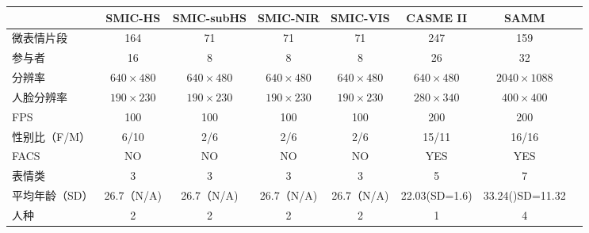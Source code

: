 \begin{table}[!htbp]
    \label{tab1}
    \centering
    \footnotesize%
    \setlength{\tabcolsep}{4pt}%
    \renewcommand{\arraystretch}{1.2}%
    \begin{tabular}{lccccccc}
    \hline
         & SMIC-HS &  SMIC-subHS &  SMIC-NIR &  SMIC-VIS &  CASME II &  SAMM \\ \hline
微表情片段    & 164       & 71         & 71       & 71       & 247           & 159             \\
参与者      & 16        & 8          & 8        & 8        & 26            & 32              \\
分辨率      & $640\times480$   & $640\times480$    & $640\times480$  & $640\times480$  & $640\times480$       & $2040\times1088$      \\
人脸分辨率    & $190\times230$   & $190\times230$    & $190\times230$  & $190\times230$  & $280\times340$       & $400\times400$         \\
FPS      & 100       & 100        & 100      & 100      & 200           & 200             \\ 
性别比（F/M） & 6/10      &  2/6          &  2/6        &  2/6        & 15/11         & 16/16           \\ 
FACS     & NO        & NO         & NO       & NO       & YES           & YES             \\
表情类      & 3         & 3          & 3        & 3        & 5             & 7               \\
平均年龄（SD） & 26.7（N/A) &   26.7（N/A) &  26.7（N/A) & 26.7（N/A)  & 22.03(SD=1.6) & 33.24()SD=11.32 \\ 
人种       & 2         & 2           &  2        & 2         & 1             & 4               \\
\hline
    \end{tabular}
\end{table}

